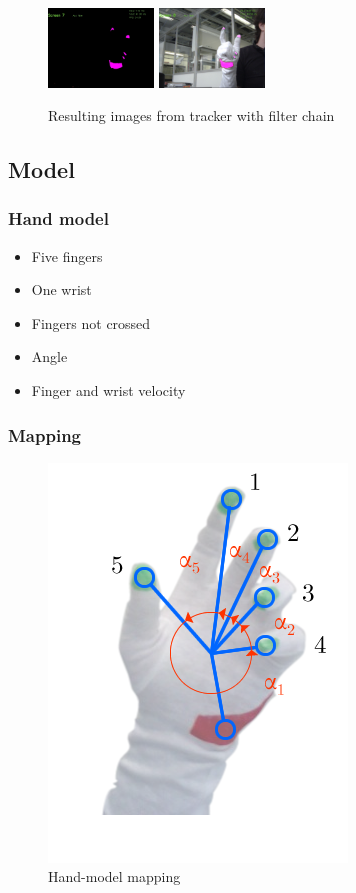 \documentclass{beamer}
\begin{document}
\begin{frame}
\begin{figure}
			\includegraphics[width=0.25\textwidth]{images/add} \hspace{0.2cm}
			\includegraphics[width=0.25\textwidth]{images/overlay} 
		\caption{Resulting images from tracker with filter chain}
	
		\end{figure}
	\end{frame}
	\subsection{Model}
	\begin{frame}
		\frametitle{Hand model}
		\begin{itemize}
			\item Five fingers
			\item One wrist
			\item Fingers not crossed
			\item Angle
			\item Finger and wrist velocity
		\end{itemize}
	\end{frame}
	\begin{frame}
		\frametitle{Mapping}
		\begin{figure}
			\includegraphics[height=0.7\textheight]{images/hand-model} 
			\caption{Hand-model mapping}
		\end{figure}
	\end{frame}
\end{document}

